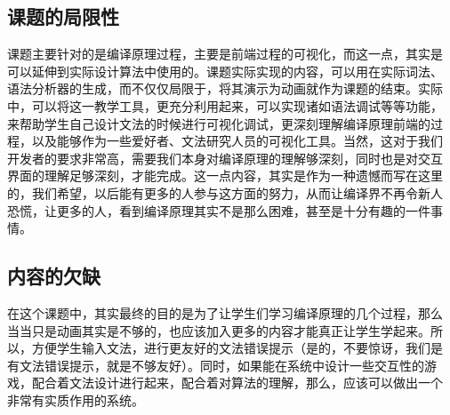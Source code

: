 \subsection{课题的局限性}
课题主要针对的是编译原理过程，主要是前端过程的可视化，而这一点，其实是
可以延伸到实际设计算法中使用的。课题实际实现的内容，可以用在实际词法、
语法分析器的生成，而不仅仅局限于，将其演示为动画就作为课题的结束。实际
中，可以将这一教学工具，更充分利用起来，可以实现诸如语法调试等等功能，
来帮助学生自己设计文法的时候进行可视化调试，更深刻理解编译原理前端的过
程，以及能够作为一些爱好者、文法研究人员的可视化工具。当然，这对于我们
开发者的要求非常高，需要我们本身对编译原理的理解够深刻，同时也是对交互
界面的理解足够深刻，才能完成。这一点内容，其实是作为一种遗憾而写在这里
的，我们希望，以后能有更多的人参与这方面的努力，从而让编译界不再令新人
恐慌，让更多的人，看到编译原理其实不是那么困难，甚至是十分有趣的一件事
情。
\subsection{内容的欠缺}
在这个课题中，其实最终的目的是为了让学生们学习编译原理的几个过程，那么
当当只是动画其实是不够的，也应该加入更多的内容才能真正让学生学起来。所
以，方便学生输入文法，进行更友好的文法错误提示（是的，不要惊讶，我们是
有文法错误提示，就是不够友好）。同时，如果能在系统中设计一些交互性的游
戏，配合着文法设计进行起来，配合着对算法的理解，那么，应该可以做出一个
非常有实质作用的系统。
